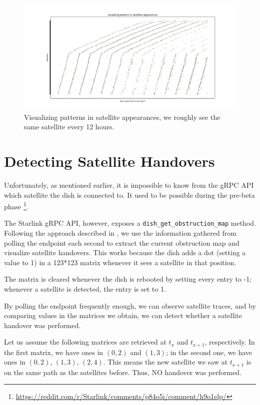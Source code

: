 \documentclass[IN,11pt,twoside,openright,idp,english]{tumthesis}
\begin{document}
\begin{figure}
    \centering
    \includegraphics[width=1.0\columnwidth]{img/visualizing-how-long-satellites-are-visible-for.png}
    \caption{Visualizing patterns in satellite appearances, we roughly see the same satellite every 12 hours.}
    \label{fig:vis-sat-pat}
\end{figure}

\section{Detecting Satellite Handovers}

Unfortunately, as mentioned earlier, it is impossible to know from the gRPC API which satellite the dish is connected to. It used to be possible during the pre-beta phase \footnote{\url{https://reddit.com/r/Starlink/comments/p84o5i/comment/h9o1elp/}}.

The Starlink gRPC API, however, exposes a \texttt{dish\_get\_obstruction\_map} method. Following the approach described in \cite{izhikevich2023democratizing}, we use the information gathered from polling the endpoint each second to extract the current obstruction map and visualize satellite handovers. This works because the dish adds a dot (setting a value to 1) in a 123*123 matrix whenever it sees a satellite in that position. 

The matrix is cleared whenever the dish is rebooted by setting every entry to -1; whenever a satellite is detected, the entry is set to 1. 

By polling the endpoint frequently enough, we can observe satellite traces, and by comparing values in the matrices we obtain, we can detect whether a satellite handover was performed.

Let us assume the following matrices are retrieved at $ t_x $ and $ t_{x+1} $, respectively. 
In the first matrix, we have ones in $ (0,2) $ and $ (1,3) $; in the second one, we have ones in $ (0,2) $, $ (1,3) $, $ (2,4) $. This means the new satellite we saw at $ t_{x+1} $ is on the same path as the satellites before. Thus, NO handover was performed. \vspace{10mm}
\end{document}
